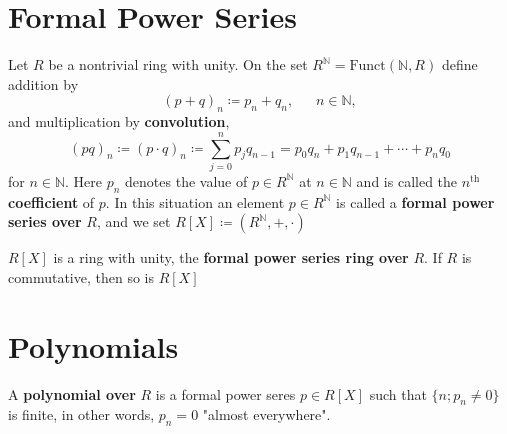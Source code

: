 \section{Formal Power Series}

\begin{definition}\label{def: formal_power_series}
    Let \(R\) be a nontrivial ring with unity. On the set \(R^{\mathbb{N}} = \text{Funct}\left(\mathbb{N}, R\right)\)
    define addition by 
    \[
        (p + q)_n \coloneqq p_n + q_n, \:\:\:\:\:\:\: n \in \mathbb{N},    
    \]
    and multiplication by \textbf{convolution},
    \[
        (pq)_n \coloneqq (p \cdot q)_n \coloneqq \sum_{j=0}^n p_j q_{n-1} = p_0q_n + p_1q_{n-1}+ \cdots + p_nq_0
    \]
    for \(n \in \mathbb{N}\). Here \(p_n\) denotes the value of \(p \in R^\mathbb{N}\) at \(n \in \mathbb{N}\) and is 
    called the \(n^{\text{th}}\) \textbf{coefficient} of \(p\). In this situation an element \(p \in R^\mathbb{N}\) is 
    called a \textbf{formal power series over} \(R\), and we set \(R \left[  X \right] \coloneqq \left(R^\mathbb{N}, +, \cdot\right) \)
    
\end{definition}

\begin{proposition}
    \(R \left[ X \right] \) is a ring with unity, the \textbf{formal power series ring over} \(R\). 
    If \(R\) is commutative, then so is \(R \left[X\right]\)
\end{proposition}

\section{Polynomials}

\begin{definition}[Polynomial]\label{def: polynomials}
    A \textbf{polynomial over} \(R\) is a formal power seres \(p \in R \left[X\right]\)
    such that \( \{n; p_n \neq 0 \} \) is finite, in other words, \(p_n = 0\) "almost everywhere". 
\end{definition}